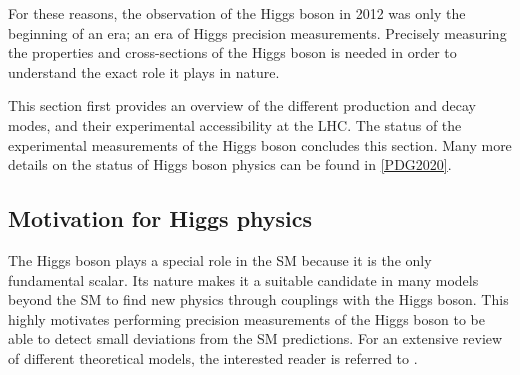 For these reasons, the observation of the Higgs boson in 2012 was only the beginning of an era; an era of Higgs precision measurements. Precisely measuring the properties and cross-sections of the Higgs boson is needed in order to understand the exact role it plays in nature. 

This section first provides an overview of the different production and decay modes, and their experimental accessibility at the LHC.
The status of the experimental measurements of the Higgs boson concludes this section.
Many more details on the status of Higgs boson physics can be found in \cref{PDG2020}.

\subsection{Motivation for Higgs physics}


The Higgs boson plays a special role in the SM because it is the only fundamental scalar. Its nature makes it a suitable candidate in many models beyond the SM to find new physics through couplings with the Higgs boson. 
This highly motivates performing precision measurements of the Higgs boson to be able to detect small deviations from the SM predictions. 
For an extensive review of different theoretical models, the interested reader is referred to .



